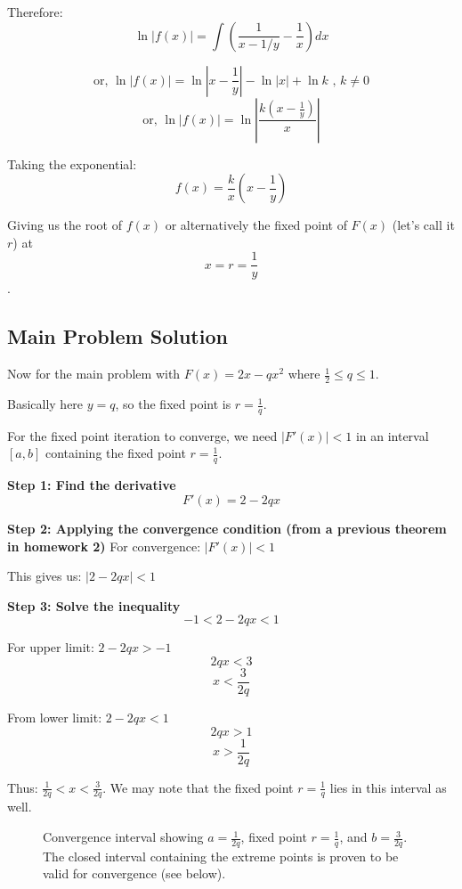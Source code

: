 Therefore:
$$\ln|f(x)| = \int\left(\frac{1}{x - 1/y} - \frac{1}{x}\right)dx$$

$$\text{or, } \ln|f(x)| = \ln\left|x - \frac{1}{y}\right| - \ln|x| + \ln k \text{ , } k \neq 0$$
$$\text{or, } \ln|f(x)| =  \ln\left|\frac{k(x - \frac{1}{y})}{x}\right|$$

Taking the exponential:
$$f(x) = \frac{k}{x}\left(x - \frac{1}{y}\right)$$

Giving us the root of $f(x)$ or alternatively the fixed point of $F(x)$ (let's call it $r$) at 
$$x = r = \frac{1}{y}$$.

\subsection*{Main Problem Solution}

Now for the main problem with $F(x) = 2x - qx^2$ where $\frac{1}{2} \leq q \leq 1$.

Basically here $y = q$, so the fixed point is $r = \frac{1}{q}$.

For the fixed point iteration to converge, we need $|F'(x)| < 1$ in an interval $[a,b]$ containing the fixed point $r = \frac{1}{q}$.

\textbf{Step 1: Find the derivative}
$$F'(x) = 2 - 2qx$$

\textbf{Step 2: Applying the convergence condition (from a previous theorem in homework 2)}
For convergence: $|F'(x)| < 1$

This gives us: $|2 - 2qx| < 1$

\textbf{Step 3: Solve the inequality}
$$-1 < 2 - 2qx < 1$$

For upper limit: $2 - 2qx > -1$
$$2qx < 3$$
$$x < \frac{3}{2q}$$

From lower limit: $2 - 2qx < 1$  
$$2qx > 1$$
$$x > \frac{1}{2q}$$

Thus: $\frac{1}{2q} < x < \frac{3}{2q}$. We may note that the fixed point $r = \frac{1}{q}$ lies in this interval as well.

\begin{figure}[h!]
\centering
{}
\caption{Convergence interval showing $a = \frac{1}{2q}$, fixed point $r = \frac{1}{q}$, and $b = \frac{3}{2q}$. The closed interval containing the extreme points is proven to be valid for convergence (see below).}
\label{fig:q04_interval}
\end{figure}


